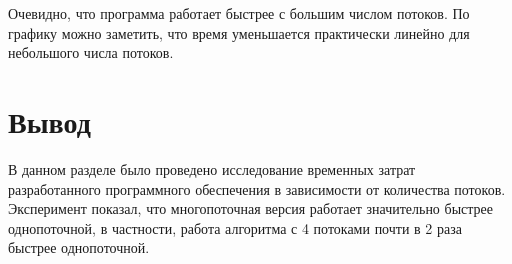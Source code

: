 \hspace{0.6cm} Очевидно, что программа работает быстрее с большим числом потоков. По графику можно заметить, что время уменьшается практически линейно для небольшого числа потоков.

\section{Вывод}
\hspace{0.6cm} В данном разделе было проведено исследование временных затрат разработанного программного обеспечения в зависимости от количества потоков. Эксперимент показал, что многопоточная версия работает значительно быстрее однопоточной, в частности, работа алгоритма с 4 потоками почти в 2 раза быстрее однопоточной.

